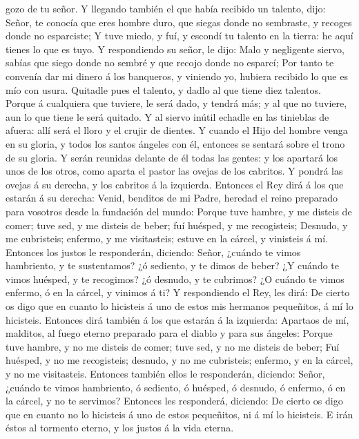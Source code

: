 gozo de tu señor.  Y llegando también el que había
recibido un talento, dijo: Señor, te conocía que eres hombre duro, que
siegas donde no sembraste, y recoges donde no esparciste;
 Y tuve miedo, y fuí, y escondí tu talento en la tierra:
he aquí tienes lo que es tuyo.  Y respondiendo su señor,
le dijo: Malo y negligente siervo, sabías que siego donde no sembré y
que recojo donde no esparcí;  Por tanto te convenía dar
mi dinero á los banqueros, y viniendo yo, hubiera recibido lo que es mío
con usura.  Quitadle pues el talento, y dadlo al que
tiene diez talentos.  Porque á cualquiera que tuviere, le
será dado, y tendrá más; y al que no tuviere, aun lo que tiene le será
quitado.  Y al siervo inútil echadle en las tinieblas de
afuera: allí será el lloro y el crujir de dientes.  Y
cuando el Hijo del hombre venga en su gloria, y todos los santos ángeles
con él, entonces se sentará sobre el trono de su gloria. 
Y serán reunidas delante de él todas las gentes: y los apartará los unos
de los otros, como aparta el pastor las ovejas de los cabritos.
 Y pondrá las ovejas á su derecha, y los cabritos á la
izquierda.  Entonces el Rey dirá á los que estarán á su
derecha: Venid, benditos de mi Padre, heredad el reino preparado para
vosotros desde la fundación del mundo:  Porque tuve
hambre, y me disteis de comer; tuve sed, y me disteis de beber; fuí
huésped, y me recogisteis;  Desnudo, y me cubristeis;
enfermo, y me visitasteis; estuve en la cárcel, y vinisteis á mí.
 Entonces los justos le responderán, diciendo: Señor,
¿cuándo te vimos hambriento, y te sustentamos? ¿ó sediento, y te dimos
de beber?  ¿Y cuándo te vimos huésped, y te recogimos? ¿ó
desnudo, y te cubrimos?  ¿O cuándo te vimos enfermo, ó en
la cárcel, y vinimos á ti?  Y respondiendo el Rey, les
dirá: De cierto os digo que en cuanto lo hicisteis á uno de estos mis
hermanos pequeñitos, á mí lo hicisteis.  Entonces dirá
también á los que estarán á la izquierda: Apartaos de mí, malditos, al
fuego eterno preparado para el diablo y para sus ángeles:
 Porque tuve hambre, y no me disteis de comer; tuve sed,
y no me disteis de beber;  Fuí huésped, y no me
recogisteis; desnudo, y no me cubristeis; enfermo, y en la cárcel, y no
me visitasteis.  Entonces también ellos le responderán,
diciendo: Señor, ¿cuándo te vimos hambriento, ó sediento, ó huésped, ó
desnudo, ó enfermo, ó en la cárcel, y no te servimos? 
Entonces les responderá, diciendo: De cierto os digo que en cuanto no lo
hicisteis á uno de estos pequeñitos, ni á mí lo hicisteis.
 E irán éstos al tormento eterno, y los justos á la vida
eterna.

